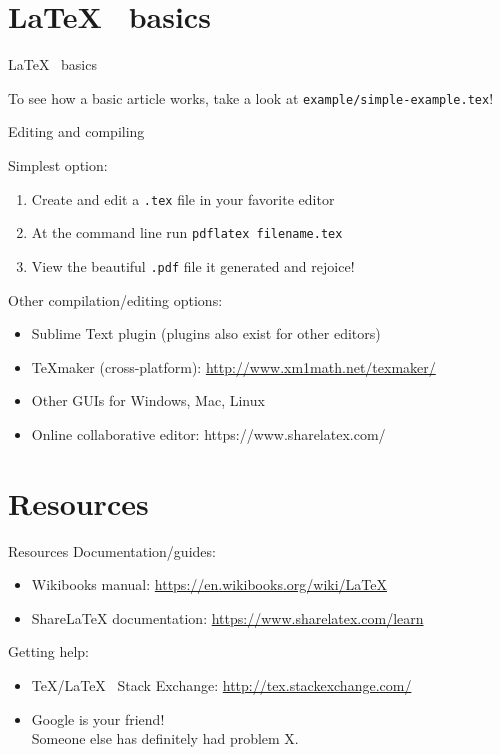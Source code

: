 \documentclass[xcolor={dvipsnames}]{beamer}
\begin{document}
\section{\LaTeX~ basics}
\begin{frame}{\LaTeX~ basics}
\begin{block}{}
To see how a basic article works, take a look at \texttt{example/simple-example.tex}!
\end{block}
\end{frame}

\begin{frame}{Editing and compiling}

Simplest option:
\begin{enumerate}
\item Create and edit a \texttt{.tex} file in your favorite editor
\item At the command line run \texttt{pdflatex filename.tex}
\item View the beautiful \texttt{.pdf} file it generated and rejoice!
\end{enumerate}
\vfill
Other compilation/editing options:
\begin{itemize}
\item Sublime Text plugin (plugins also exist for other editors)
\item TeXmaker (cross-platform): \url{http://www.xm1math.net/texmaker/}
\item Other GUIs for Windows, Mac, Linux
\item Online collaborative editor: https://www.sharelatex.com/
\end{itemize}
\end{frame}

\section{Resources}
\label{resources}
\begin{frame}{Resources}
Documentation/guides:
\begin{itemize}
\item Wikibooks manual: \url{https://en.wikibooks.org/wiki/LaTeX}
\item ShareLaTeX documentation: \url{https://www.sharelatex.com/learn}
\end{itemize}
\vfill
Getting help:
\begin{itemize}
\item \TeX/\LaTeX~ Stack Exchange: \url{http://tex.stackexchange.com/}
\item Google is your friend!\\Someone else has definitely had problem X.
\end{itemize}
\end{frame}
\end{document}
